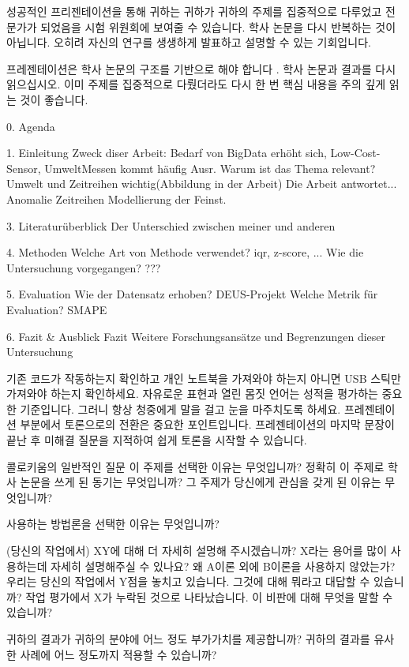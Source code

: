 성공적인 프리젠테이션을 통해 귀하는 귀하가 귀하의 주제를 집중적으로 다루었고 전문가가 되었음을 시험 위원회에 보여줄 수 있습니다.
학사 논문을 다시 반복하는 것이 아닙니다. 오히려 자신의 연구를 생생하게 발표하고 설명할 수 있는 기회입니다.

프레젠테이션은 학사 논문의 구조를 기반으로 해야 합니다 .
학사 논문과 결과를 다시 읽으십시오. 이미 주제를 집중적으로 다뤘더라도 다시 한 번 핵심 내용을 주의 깊게 읽는 것이 좋습니다.


0. Agenda

1. Einleitung
    Zweck diser Arbeit: Bedarf von BigData erhöht sich, Low-Cost-Sensor, UmweltMessen kommt häufig Ausr.
    Warum ist das Thema relevant? Umwelt und Zeitreihen wichtig(Abbildung in der Arbeit)
    Die Arbeit antwortet... 
    Anomalie
    Zeitreihen
    Modellierung der Feinst.

3. Literaturüberblick
    Der Unterschied zwischen meiner und anderen

4. Methoden
    Welche Art von Methode verwendet? iqr, z-score, ...
    Wie die Untersuchung vorgegangen? ???

    
    

5. Evaluation
    Wie der Datensatz erhoben?  DEUS-Projekt
    Welche Metrik für Evaluation?  SMAPE
    
6. Fazit & Ausblick
    Fazit
    Weitere Forschungsansätze und Begrenzungen dieser Untersuchung








기존 코드가 작동하는지 확인하고 개인 노트북을 가져와야 하는지 아니면 USB 스틱만 가져와야 하는지 확인하세요.
자유로운 표현과 열린 몸짓 언어는 성적을 평가하는 중요한 기준입니다. 그러니 항상 청중에게 말을 걸고 눈을 마주치도록 하세요.
프레젠테이션 부분에서 토론으로의 전환은 중요한 포인트입니다. 프레젠테이션의 마지막 문장이 끝난 후 미해결 질문을 지적하여 쉽게 토론을 시작할 수 있습니다.




콜로키움의 일반적인 질문
    이 주제를 선택한 이유는 무엇입니까?
    정확히 이 주제로 학사 논문을 쓰게 된 동기는 무엇입니까?
    그 주제가 당신에게 관심을 갖게 된 이유는 무엇입니까?

    사용하는 방법론을 선택한 이유는 무엇입니까?

    (당신의 작업에서) XY에 대해 더 자세히 설명해 주시겠습니까?
    X라는 용어를 많이 사용하는데 자세히 설명해주실 수 있나요?
    왜 A이론 외에 B이론을 사용하지 않았는가?
    우리는 당신의 작업에서 Y점을 놓치고 있습니다. 그것에 대해 뭐라고 대답할 수 있습니까?
    작업 평가에서 X가 누락된 것으로 나타났습니다. 이 비판에 대해 무엇을 말할 수 있습니까?

    귀하의 결과가 귀하의 분야에 어느 정도 부가가치를 제공합니까?
    귀하의 결과를 유사한 사례에 어느 정도까지 적용할 수 있습니까?